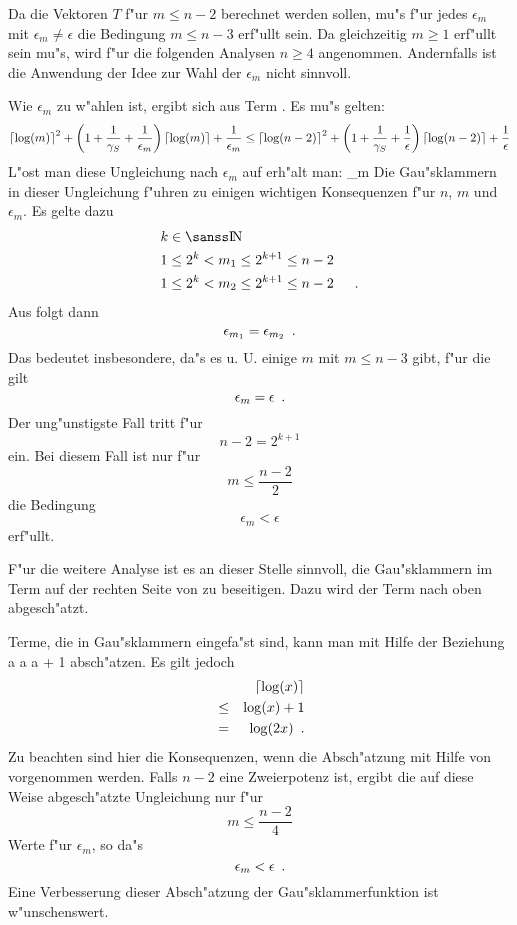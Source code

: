 Da die Vektoren $T$ f"ur $m \leq n-2$ berechnet werden sollen, mu"s f"ur
jedes $\epsilon_m$ mit $\epsilon_m \neq \epsilon$ die 
Bedingung $m \leq n-3$ erf"ullt sein.
Da gleichzeitig $m \geq 1$ erf"ullt sein mu"s, wird f"ur die folgenden
Analysen $n \geq 4$ angenommen. Andernfalls ist die Anwendung der Idee
zur Wahl der $\epsilon_m$ nicht sinnvoll.

Wie $\epsilon_m$ zu w"ahlen ist, ergibt sich aus
Term . Es mu"s gelten:
\[
   \left\lceil \log(m) \right\rceil^2 
   + \left( 1 + \frac{1}{\gamma_S} 
   + \frac{1}{\epsilon_m} \right) \left\lceil \log(m) \right\rceil +
   \frac{1}{\epsilon_m}
       \leq
   \left\lceil \log(n-2) \right\rceil^2 
   + \left( 1 + \frac{1}{\gamma_S} 
   + \frac{1}{\epsilon} \right) \left\lceil \log(n-2) \right\rceil +
   \frac{1}{\epsilon}
\]
L"ost man diese Ungleichung nach $\epsilon_m$ auf erh"alt man:
   \epsilon_m
       \geq
\Eeq
Die Gau"sklammern in dieser Ungleichung f"uhren zu einigen wichtigen
Konsequenzen f"ur $n$, $m$ und $\epsilon_m$. Es gelte dazu 
\begin{eqnarray*}
    & k \in \Nat & \\
    & 1 \leq 2^k < m_1 \leq 2^{k+1} \leq n-2 & \\
    & 1 \leq 2^k < m_2 \leq 2^{k+1} \leq n-2 & \MyPunkt
\end{eqnarray*}
Aus  folgt dann
\[
    \epsilon_{m_1} = \epsilon_{m_2} \mbox{\hspace{0.5em}.}
\]
Das bedeutet insbesondere, da"s es u. U. einige $m$ mit 
$m \leq n-3$ gibt, f"ur die gilt 
\[ \epsilon_m = \epsilon \mbox{\hspace{0.5em}.} \] Der ung"unstigste Fall tritt f"ur
\[ n-2 = 2^{k+1} \] ein. Bei diesem Fall ist nur f"ur 
\[ m \leq \frac{n-2}{2} \]
die Bedingung \[ \epsilon_m < \epsilon \] erf"ullt.

F"ur die weitere Analyse ist es an dieser Stelle sinnvoll, die Gau"sklammern
im Term auf der rechten Seite von  zu beseitigen. 
Dazu wird
der Term nach oben abgesch"atzt.

Terme, die in Gau"sklammern eingefa"st sind, kann man mit Hilfe der
Beziehung
    a \leq \lc a \rc \leq a + 1
\Eeq
absch"atzen. Es gilt jedoch
\begin{eqnarray*}
   &      & \left\lceil \log(x) \right\rceil \\
   & \leq & \log(x) + 1     \\
   & =    & \log(2x) \mbox{\hspace{0.5em}.}
\end{eqnarray*} 
Zu beachten sind hier die Konsequenzen, wenn die Absch"atzung mit Hilfe
von  vorgenommen werden. Falls $n-2$ eine 
Zweierpotenz ist, ergibt die auf diese Weise abgesch"atzte Ungleichung 
 nur
f"ur \[ m \leq \frac{n-2}{4} \] Werte f"ur $\epsilon_m$, so da"s 
\[ \epsilon_m < \epsilon \mbox{\hspace{0.5em}.} \]
Eine Verbesserung dieser Absch"atzung der Gau"sklammerfunktion ist 
w"unschenswert.

